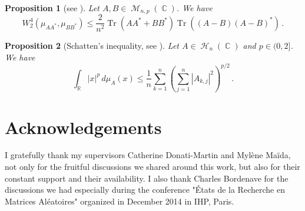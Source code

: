 \documentclass[11pt,a4paper]{article}
\DeclareMathOperator{\R}{\mathbb{R}}
\DeclareMathOperator{\C}{\mathbb{C}}
\DeclareMathOperator{\HH}{\mathcal{H}}
\DeclareMathOperator{\MM}{\mathcal{M}}
\DeclareMathOperator{\1}{\mathbf{1}}
\DeclareMathOperator{\Tr}{\mathrm{Tr}}
\newtheorem{Proposition}{Proposition}[section]
\theoremstyle{definition}
\begin{document}
\begin{Proposition}[see {\cite[Corollary A.42]{BS}}]
Let $A,B \in \MM_{n,p}(\C)$. We have
\begin{equation} \label{HW_covariance}
W_2^4(\mu_{AA^*},\mu_{BB^*}) \le \frac{2}{n^2} \Tr(AA^*+BB^*) \Tr((A-B)(A-B)^*) \, .
\end{equation}
\end{Proposition}

\begin{Proposition}[Schatten's inequality, see {\cite[Theorem 3.32]{Zhan}}]
Let $A \in \HH_n(\C)$ and $p \in (0,2]$. We have
\begin{equation} \label{Schatten}
\int_{\R} |x|^p \, d\mu_A(x) \le \frac1n \sum_{k=1}^n \left( \sum_{j=1}^n |A_{k,j}|^2 \right)^{p/2} \, .
\end{equation}
\end{Proposition}




\section*{Acknowledgements}

I gratefully thank my supervisors Catherine Donati-Martin and Myl\`ene Ma\"ida, not only for the fruitful discussions we shared around this work, but also for their constant support and their availability. I also thank Charles Bordenave for the discussions we had especially during the conference "\'Etats de la Recherche en Matrices Al\'eatoires" organized in December 2014 in IHP, Paris.






\end{document}
